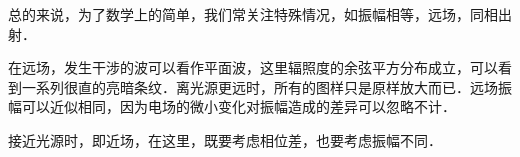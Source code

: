 总的来说，为了数学上的简单，我们常关注特殊情况，如振幅相等，远场，同相出射．

在远场，发生干涉的波可以看作平面波，这里辐照度的余弦平方分布成立，可以看到一系列很直的亮暗条纹．离光源更远时，所有的图样只是原样放大而已．远场振幅可以近似相同，因为电场的微小变化对振幅造成的差异可以忽略不计．

接近光源时，即近场，在这里，既要考虑相位差，也要考虑振幅不同．








